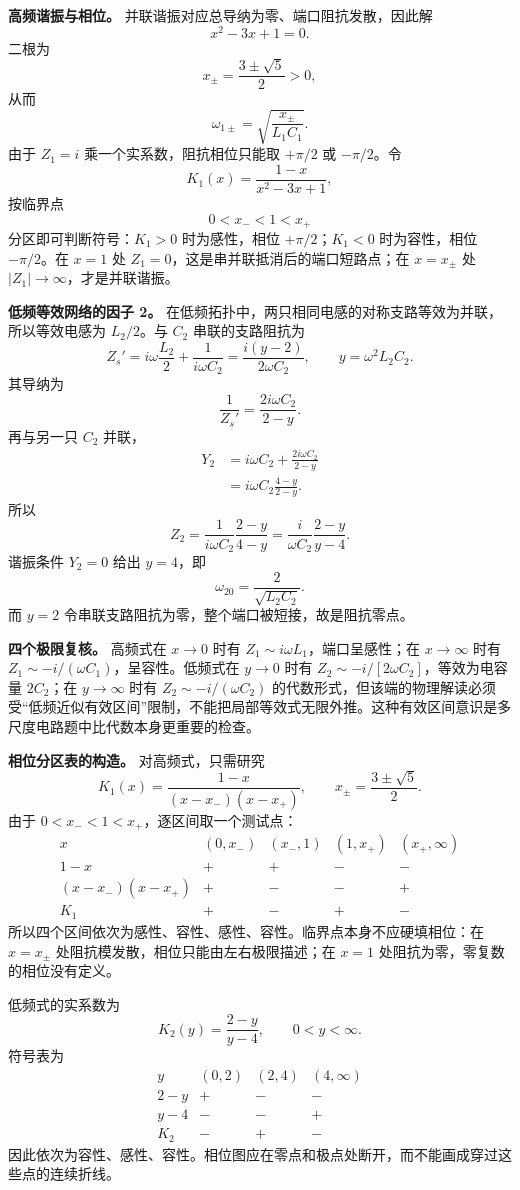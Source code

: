 \documentclass[12pt,a4paper,UTF8]{ctexart}
\begin{document}
\textbf{高频谐振与相位。} 并联谐振对应总导纳为零、端口阻抗发散，因此解
\[
x^2-3x+1=0.
\] 二根为 \[
x_{\pm}=\frac{3\pm\sqrt5}{2}>0,
\] 从而 \[
\omega_{1\pm}
=\sqrt{\frac{x_\pm}{L_1C_1}}.
\] 由于 \(Z_1=i\) 乘一个实系数，阻抗相位只能取 \(+\pi/2\) 或
\(-\pi/2\)。令 \[
K_1(x)=\frac{1-x}{x^2-3x+1},
\] 按临界点 \[
0<x_-<1<x_+
\] 分区即可判断符号：\(K_1>0\) 时为感性，相位 \(+\pi/2\)；\(K_1<0\)
时为容性，相位 \(-\pi/2\)。在 \(x=1\) 处
\(Z_1=0\)，这是串并联抵消后的端口短路点；在 \(x=x_\pm\) 处
\(|Z_1|\to\infty\)，才是并联谐振。

\textbf{低频等效网络的因子 2。}
在低频拓扑中，两只相同电感的对称支路等效为并联，所以等效电感为
\(L_2/2\)。与 \(C_2\) 串联的支路阻抗为 \[
Z_s'=i\omega\frac{L_2}{2}+\frac1{i\omega C_2}
=\frac{i(y-2)}{2\omega C_2},
\qquad y=\omega^2L_2C_2.
\] 其导纳为 \[
\frac1{Z_s'}=\frac{2i\omega C_2}{2-y}.
\] 再与另一只 \(C_2\) 并联， \[
\begin{aligned}
Y_2
&=i\omega C_2+\frac{2i\omega C_2}{2-y}\\
&=i\omega C_2\frac{4-y}{2-y}.
\end{aligned}
\] 所以 \[
Z_2=\frac1{i\omega C_2}\frac{2-y}{4-y}
=\frac{i}{\omega C_2}\frac{2-y}{y-4}.
\] 谐振条件 \(Y_2=0\) 给出 \(y=4\)，即 \[
\omega_{20}=\frac2{\sqrt{L_2C_2}}.
\] 而 \(y=2\) 令串联支路阻抗为零，整个端口被短接，故是阻抗零点。

\textbf{四个极限复核。} 高频式在 \(x\to0\) 时有
\(Z_1\sim i\omega L_1\)，端口呈感性；在 \(x\to\infty\) 时有
\(Z_1\sim-i/(\omega C_1)\)，呈容性。低频式在 \(y\to0\) 时有
\(Z_2\sim-i/[2\omega C_2]\)，等效为电容量 \(2C_2\)；在 \(y\to\infty\)
时有 \(Z_2\sim-i/(\omega C_2)\)
的代数形式，但该端的物理解读必须受``低频近似有效区间''限制，不能把局部等效式无限外推。这种有效区间意识是多尺度电路题中比代数本身更重要的检查。

\textbf{相位分区表的构造。} 对高频式，只需研究 \[
K_1(x)=\frac{1-x}{(x-x_-)(x-x_+)},\qquad
x_\pm=\frac{3\pm\sqrt5}{2}.
\] 由于 \(0<x_-<1<x_+\)，逐区间取一个测试点： \[
\begin{array}{c|cccc}
x&(0,x_-)&(x_-,1)&(1,x_+)&(x_+,\infty)\\ \hline
1-x&+&+&-&-\\
(x-x_-)(x-x_+)&+&-&-&+\\ \hline
K_1&+&-&+&-
\end{array}
\] 所以四个区间依次为感性、容性、感性、容性。临界点本身不应硬填相位：在
\(x=x_\pm\) 处阻抗模发散，相位只能由左右极限描述；在 \(x=1\)
处阻抗为零，零复数的相位没有定义。

低频式的实系数为 \[
K_2(y)=\frac{2-y}{y-4},\qquad 0<y<\infty.
\] 符号表为 \[
\begin{array}{c|ccc}
y&(0,2)&(2,4)&(4,\infty)\\ \hline
2-y&+&-&-\\
y-4&-&-&+\\ \hline
K_2&-&+&-
\end{array}
\]
因此依次为容性、感性、容性。相位图应在零点和极点处断开，而不能画成穿过这些点的连续折线。
\end{document}
